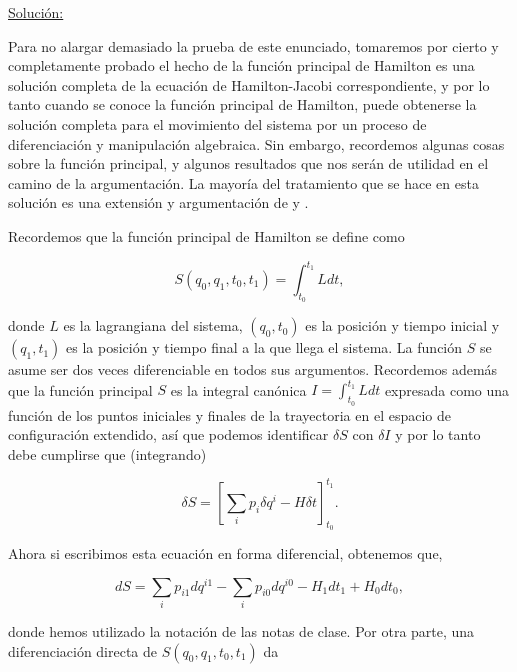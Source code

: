 \documentclass[a4paper,10pt]{article}
\numberwithin{equation}{section}
\begin{document}
\vspace{.3cm}

\underline{Solución:} \vspace{.3cm}

Para no alargar demasiado la prueba de este enunciado, tomaremos por cierto 
y completamente probado el hecho de la función principal de Hamilton es
una solución completa  de la ecuación de Hamilton-Jacobi 
correspondiente, y por lo tanto cuando se conoce la función principal de 
Hamilton, puede obtenerse la solución completa para el movimiento del 
sistema por un proceso de diferenciación y manipulación algebraica. Sin 
embargo, recordemos algunas cosas sobre la función principal, y algunos 
resultados que nos serán de utilidad en el camino de la argumentación. 
La mayoría del tratamiento que se hace en esta solución es una extensión 
y argumentación de \cite{greenwood} y \cite{ardema}.

\vspace{.3cm}

Recordemos que la función principal de Hamilton se define como 

\begin{equation}
 S(q_0,q_1,t_0,t_1) = \int_{t_0}^{t_1} L dt,
\end{equation}

donde $L$ es la lagrangiana del sistema, $(q_0,t_0)$ es la posición 
y tiempo inicial y $(q_1,t_1)$ es la posición y tiempo final a la 
que llega el sistema. La función $S$ se asume ser dos veces diferenciable 
en todos sus argumentos. Recordemos además que la función principal $S$ 
es la integral canónica $I = \int_{t_0}^{t_1} L dt$ expresada como 
una función de los puntos iniciales y finales de la trayectoria en el 
espacio de configuración extendido, así que podemos identificar $\delta S$ 
con $\delta I$ y por lo tanto debe cumplirse que (integrando)

\begin{equation}
 \delta S = \left[ \sum_i p_i \delta q^i - H \delta t \right]_{t_0}^{t_1}.
\end{equation}

Ahora si escribimos esta ecuación en forma diferencial, obtenemos que,

\begin{equation}
 dS = \sum_i p_{i1}dq^{i1} - \sum_i p_{i0}dq^{i0} - H_1 dt_1 + 
 H_0 dt_0,
 \label{eq:515}
\end{equation}

donde hemos utilizado la notación de las notas de clase. Por otra parte, 
una diferenciación directa de $S(q_0,q_1,t_0,t_1)$ da 
\end{document}

